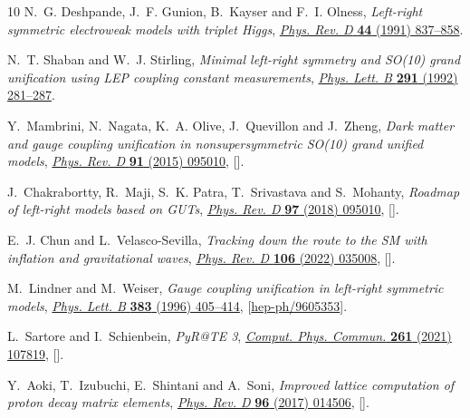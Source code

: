 \documentclass[11pt]{article}
\begin{document}
\begin{thebibliography}{10}
N.~G. Deshpande, J.~F. Gunion, B.~Kayser and F.~I. Olness, \emph{{Left-right
  symmetric electroweak models with triplet Higgs}},
  \href{https://doi.org/10.1103/PhysRevD.44.837}{\emph{Phys. Rev. D} {\bfseries
  44} (1991) 837--858}.

N.~T. Shaban and W.~J. Stirling, \emph{{Minimal left-right symmetry and SO(10)
  grand unification using LEP coupling constant measurements}},
  \href{https://doi.org/10.1016/0370-2693(92)91046-C}{\emph{Phys. Lett. B}
  {\bfseries 291} (1992) 281--287}.

Y.~Mambrini, N.~Nagata, K.~A. Olive, J.~Quevillon and J.~Zheng, \emph{{Dark
  matter and gauge coupling unification in nonsupersymmetric SO(10) grand
  unified models}},
  \href{https://doi.org/10.1103/PhysRevD.91.095010}{\emph{Phys. Rev. D}
  {\bfseries 91} (2015) 095010},
  [\href{https://arxiv.org/abs/1502.06929}{{}}].

J.~Chakrabortty, R.~Maji, S.~K. Patra, T.~Srivastava and S.~Mohanty,
  \emph{{Roadmap of left-right models based on GUTs}},
  \href{https://doi.org/10.1103/PhysRevD.97.095010}{\emph{Phys. Rev. D}
  {\bfseries 97} (2018) 095010},
  [\href{https://arxiv.org/abs/1711.11391}{{}}].

E.~J. Chun and L.~Velasco-Sevilla, \emph{{Tracking down the route to the SM
  with inflation and gravitational waves}},
  \href{https://doi.org/10.1103/PhysRevD.106.035008}{\emph{Phys. Rev. D}
  {\bfseries 106} (2022) 035008},
  [\href{https://arxiv.org/abs/2112.14483}{{}}].

M.~Lindner and M.~Weiser, \emph{{Gauge coupling unification in left-right
  symmetric models}},
  \href{https://doi.org/10.1016/0370-2693(96)00775-7}{\emph{Phys. Lett. B}
  {\bfseries 383} (1996) 405--414},
  [\href{https://arxiv.org/abs/hep-ph/9605353}{{\ttfamily hep-ph/9605353}}].

L.~Sartore and I.~Schienbein, \emph{{PyR@TE 3}},
  \href{https://doi.org/10.1016/j.cpc.2020.107819}{\emph{Comput. Phys. Commun.}
  {\bfseries 261} (2021) 107819},
  [\href{https://arxiv.org/abs/2007.12700}{{}}].

Y.~Aoki, T.~Izubuchi, E.~Shintani and A.~Soni, \emph{{Improved lattice
  computation of proton decay matrix elements}},
  \href{https://doi.org/10.1103/PhysRevD.96.014506}{\emph{Phys. Rev. D}
  {\bfseries 96} (2017) 014506},
  [\href{https://arxiv.org/abs/1705.01338}{{}}].


\end{thebibliography}
\end{document}
